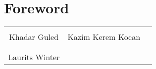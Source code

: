 \chapter{Foreword}


\phantom{Luft}

\phantom{Luft}

\begin{table}[H]
	\centering
		\begin{tabular}{c c c}
			\underline{\phantom{mmmmmmmmmmmmmmmmmmmmmm}} & \underline{\phantom{mmmmmmmmmmmmmmmmmmmmmm}} \\
			Khadar Guled			& Kazim Kerem Kocan\\
            \vspace{0.5cm}\\
            \underline{\phantom{mmmmmmmmmmmmmmmmmmmmmm}} \\
			Laurits Winter\\

		\end{tabular}
\end{table}